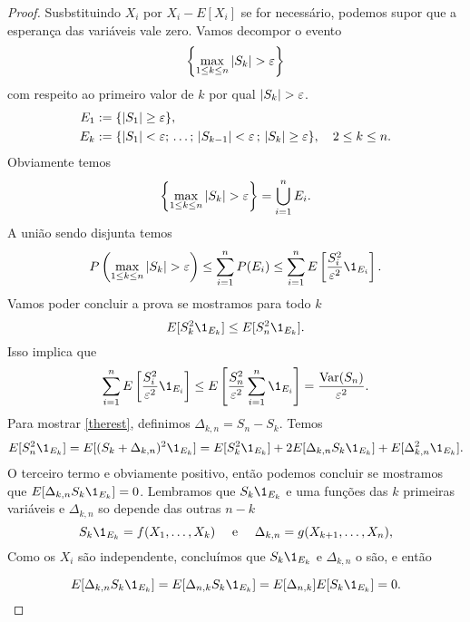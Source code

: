 \begin{topics}
\begin{proof}
 Susbstituindo $X_i$ por $X_i-E[X_i]$ se for necessário, podemos supor que a esperança das variáveis vale zero.
 Vamos decompor o evento 
 $$\left\{ \max_{1\le k\le n} |S_k|>\gep \right\}$$ com respeito ao primeiro valor de $k$ por qual $|S_k|>\gep$.
 \begin{equation}
  \begin{split}
E_1&:=\{|S_1|\ge \varepsilon  \},\\
E_k&:=\{|S_1|<\varepsilon;\, \dots ;\,  |S_{k-1}|<\varepsilon\, ;  \, |S_k|\ge \varepsilon  \}, \quad 2\le k\le n.
   \end{split}
\end{equation}
Obviamente temos $$\left\{\max_{1\le k\le n} |S_k|>\gep\right\}=\bigcup_{i=1}^n E_i.$$
A união sendo disjunta temos 
\begin{equation}
P\left(\max_{1\le k\le n} |S_k|>\gep \right) \le  \sum_{i=1}^n P(E_i)\le  \sum_{i=1}^n E\left[  \frac{S^2_i}{\gep^2}\1_{E_i}\right].
\end{equation}
Vamos poder concluir a prova se mostramos para todo $k$
\begin{equation}\label{therest}
 E[S^2_k\1_{E_k}]\le E[S^2_n\1_{E_k}].
\end{equation}
Isso implica que 
\begin{equation}
  \sum_{i=1}^n E\left[  \frac{S^2_i}{\gep^2}\1_{E_i}\right]\le E\left [  \frac{S^2_n}{\gep^2}  \sum_{i=1}^n \1_{E_i}\right]= \frac{\Var(S_n)}{\gep^2}.
\end{equation}
Para mostrar \eqref{therest}, definimos $\Delta_{k,n}= S_n-S_k$.
Temos 
\begin{equation}
  E[S^2_n\1_{E_k}]= E[(S_k+\Delta_{k,n})^2\1_{E_k}]= E[S_k^2\1_{E_k}]+2 E[ \Delta_{k,n} S_k \1_{E_k}]+  E[ \Delta^2_{k,n}\1_{E_k}].
\end{equation}
O terceiro termo e obviamente positivo, então podemos concluir se mostramos  que $E[ \Delta_{k,n} S_k \1_{E_k}]=0$.
Lembramos que $S_k\1_{E_k}$ e uma funções das $k$ primeiras variáveis e $\Delta_{k,n}$ so depende das outras $n-k$
\begin{equation}
 S_k \1_{E_k}=f(X_1,\dots,X_k) \quad \text{ e } \quad \Delta_{k,n}=g(X_{k+1},\dots,X_{n}),
\end{equation}
Como os $X_i$ são independente, concluímos que  $S_k \1_{E_k}$ e $\Delta_{k,n}$ o são, e então

\begin{equation}
 E[ \Delta_{k,n} S_k \1_{E_k}]=E[\Delta_{n,k}S_k \1_{E_k}]=E[\Delta_{n,k}]E[S_k \1_{E_k}]=0.
\end{equation}
\end{proof}


\end{topics}
